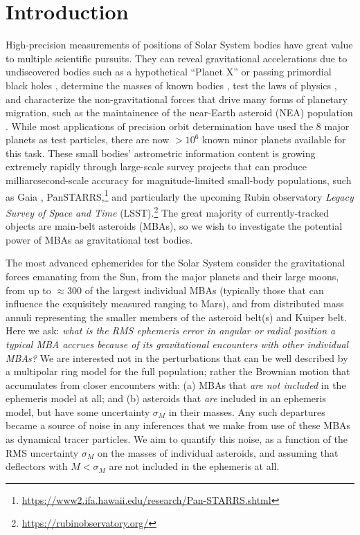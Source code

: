 \documentclass[linenumbers, onecolumn]{aastex631}
\newcommand{\eg}{\textit{e.g.\/}}
\begin{document}
\section{Introduction}

High-precision measurements of positions of Solar System bodies have
great value to multiple scientific pursuits.  They can reveal
gravitational accelerations due to undiscovered bodies such as a
hypothetical ``Planet X'' \citep[\eg][]{holmanP9,inpopP9,trojans,occultations} or passing primordial
black holes \citep[\eg][]{pbh}, determine
the masses of known bodies \citep[\eg][]{goffin,baer}, test the laws
of physics \citep[\eg][]{inpopgraviton}, and characterize 
the non-gravitational forces that drive many forms of planetary
migration, such as the maintainence of the near-Earth asteroid (NEA)
population \citep[reviewed by][]{yarkovsky}.  While most applications of precision orbit determination
have used the 8 major planets as test particles, there are now $>10^6$
known minor planets available for this task.  These small bodies' astrometric
information content is growing extremely rapidly through large-scale
survey projects that can produce
milliarcsecond-scale accuracy for magnitude-limited small-body populations, such as Gaia \citep{gaiass3,gaiafpr},
PanSTARRS,\footnote{\url{https://www2.ifa.hawaii.edu/research/Pan-STARRS.shtml}}
and particularly the upcoming Rubin observatory
\textit{Legacy Survey of Space and Time} (LSST).\footnote{\url{https://rubinobservatory.org/}}  The great majority
of currently-tracked objects are main-belt asteroids (MBAs), so we
wish to investigate the potential power of MBAs as gravitational test
bodies.

The most advanced ephemerides for the Solar System \citep{de440,inpop,pitjeva} consider the
gravitational forces emanating from the Sun, from the major planets and their large
moons, from up to $\approx300$ of the largest individual MBAs (typically those that can influence the exquisitely measured ranging to Mars), and
from distributed mass annuli representing the smaller members of
 the asteroid belt(s) and Kuiper belt.
Here we ask: \textit{what is the RMS ephemeris error in angular or radial
position a typical MBA accrues because of its gravitational
encounters with other individual MBAs?}  We are interested not in the
perturbations that can be well described by a multipolar ring model
for the full population; rather the Brownian motion that accumulates
from closer encounters with: (a) MBAs that \emph{are not included} in the
ephemeris model at all; and (b) asteroids that \emph{are} included
in an ephemeris model, but have some uncertainty $\sigma_M$ in their masses.
Any such departures became a source of noise in any
inferences that we make from use of these MBAs as
dynamical tracer particles.  We aim to quantify this noise, as a
function of the RMS uncertainty $\sigma_M$ on the masses of individual
asteroids, and assuming that deflectors with $M<\sigma_M$ are not
included in the ephemeris at all.
\end{document}
